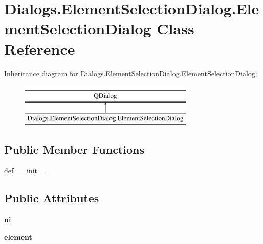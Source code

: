 \hypertarget{classDialogs_1_1ElementSelectionDialog_1_1ElementSelectionDialog}{\section{Dialogs.\-Element\-Selection\-Dialog.\-Element\-Selection\-Dialog Class Reference}
\label{classDialogs_1_1ElementSelectionDialog_1_1ElementSelectionDialog}
}
Inheritance diagram for Dialogs.\-Element\-Selection\-Dialog.\-Element\-Selection\-Dialog\-:\begin{figure}[H]
\begin{center}
\leavevmode
\includegraphics[height=2.000000cm]{classDialogs_1_1ElementSelectionDialog_1_1ElementSelectionDialog}
\end{center}
\end{figure}
\subsection*{Public Member Functions}
\begin{DoxyCompactItemize}
\item 
def \hyperlink{classDialogs_1_1ElementSelectionDialog_1_1ElementSelectionDialog_ac4b575bc1ba5dfdec580cb540f35fa68}{\-\_\-\-\_\-init\-\_\-\-\_\-}
\end{DoxyCompactItemize}
\subsection*{Public Attributes}
\begin{DoxyCompactItemize}
\item 
\hypertarget{classDialogs_1_1ElementSelectionDialog_1_1ElementSelectionDialog_ab4359e72c390640f84f6d753f9e6cb83}{{\bfseries ui}}\label{classDialogs_1_1ElementSelectionDialog_1_1ElementSelectionDialog_ab4359e72c390640f84f6d753f9e6cb83}

\item 
\hypertarget{classDialogs_1_1ElementSelectionDialog_1_1ElementSelectionDialog_a6409795c3364ddfa79b8d225e24a2d93}{{\bfseries element}}\label{classDialogs_1_1ElementSelectionDialog_1_1ElementSelectionDialog_a6409795c3364ddfa79b8d225e24a2d93}

\end{DoxyCompactItemize}


